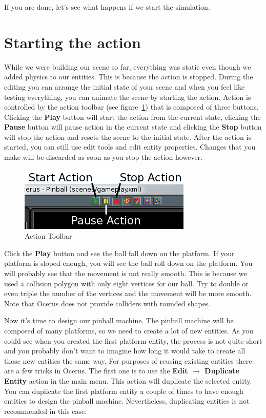 \documentclass[a4paper,12pt]{article}
\begin{document}
If you are done, let's see what happens if we start the simulation.

\section{Starting the action}
While we were building our scene so far, everything was static even though we added physics to our entities. This is because the action is stopped. During the editing you can arrange the initial state of your scene and when you feel like testing everything, you can animate the scene by starting the action. Action is controlled by the action toolbar (see figure~\ref{fig:action_toolbar}) that is composed of three buttons. Clicking the \textbf{Play} button will start the action from the current state, clicking the \textbf{Pause} button will pause action in the current state and clicking the \textbf{Stop} button will stop the action and resets the scene to the initial state. After the action is started, you can still use edit tools and edit entity properties. Changes that you make will be discarded as soon as you stop the action however.

\begin{figure}[ht]
 \begin{center}
  \includegraphics[scale=0.65]{ActionToolbar}
 \end{center}
 \caption{Action Toolbar}
 \label{fig:action_toolbar}
\end{figure}


Click the \textbf{Play} button and see the ball fall down on the platform. If your platform is sloped enough, you will see the ball roll down on the platform. You will probably see that the movement is not really smooth. This is because we used a collision polygon with only eight vertices for our ball. Try to double or even triple the number of the vertices and the movement will be more smooth. Note that Ocerus does not provide colliders with rounded shapes.
 
Now it's time to design our pinball machine. The pinball machine will be composed of many platforms, so we need to create a lot of new entities. As you could see when you created the first platform entity, the process is not quite short and you probably don't want to imagine how long it would take to create all those new entities the same way. For purposes of reusing existing entities there are a few tricks in Ocerus. The first one is to use the \textbf{Edit $\to$ Duplicate Entity} action in the main menu. This action will duplicate the selected entity. You can duplicate the first platform entity a couple of times to have enough entities to design the pinball machine. Nevertheless, duplicating entities is not recommended in this case. 
\end{document}
